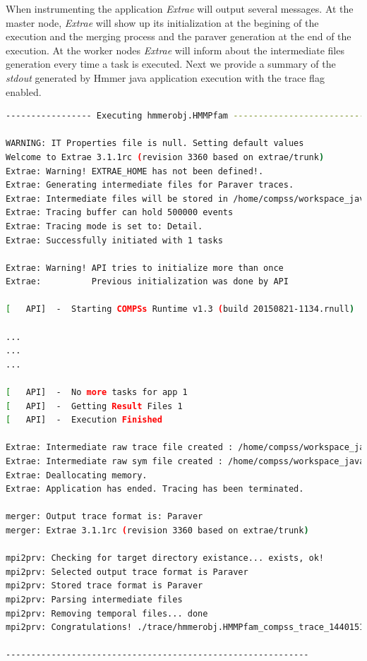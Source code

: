 When instrumenting the application \textit{Extrae} will output several messages. At the master node, \textit{Extrae} will show up its
initialization at the begining of the execution and the merging process and the paraver generation at the end of the execution. At the
worker nodes \textit{Extrae} will inform about the intermediate files generation every time a task is executed. Next we provide a 
summary of the \textit{stdout} generated by Hmmer java application execution with the trace flag enabled. 
\begin{lstlisting}[language=bash]
----------------- Executing hmmerobj.HMMPfam --------------------------

WARNING: IT Properties file is null. Setting default values
Welcome to Extrae 3.1.1rc (revision 3360 based on extrae/trunk)
Extrae: Warning! EXTRAE_HOME has not been defined!.
Extrae: Generating intermediate files for Paraver traces.
Extrae: Intermediate files will be stored in /home/compss/workspace_java/hmmerobj/jar
Extrae: Tracing buffer can hold 500000 events
Extrae: Tracing mode is set to: Detail.
Extrae: Successfully initiated with 1 tasks

Extrae: Warning! API tries to initialize more than once
Extrae:          Previous initialization was done by API

[   API]  -  Starting COMPSs Runtime v1.3 (build 20150821-1134.rnull)

...
...
...

[   API]  -  No more tasks for app 1
[   API]  -  Getting Result Files 1
[   API]  -  Execution Finished

Extrae: Intermediate raw trace file created : /home/compss/workspace_java/hmmerobj/jar/set-0/TRACE@bsc.0000031637000000000000.mpit
Extrae: Intermediate raw sym file created : /home/compss/workspace_java/hmmerobj/jar/set-0/TRACE@bsc.0000031637000000000000.sym
Extrae: Deallocating memory.
Extrae: Application has ended. Tracing has been terminated.

merger: Output trace format is: Paraver
merger: Extrae 3.1.1rc (revision 3360 based on extrae/trunk)

mpi2prv: Checking for target directory existance... exists, ok!
mpi2prv: Selected output trace format is Paraver
mpi2prv: Stored trace format is Paraver
mpi2prv: Parsing intermediate files
mpi2prv: Removing temporal files... done
mpi2prv: Congratulations! ./trace/hmmerobj.HMMPfam_compss_trace_1440151114.prv has been generated.

------------------------------------------------------------
\end{lstlisting}

